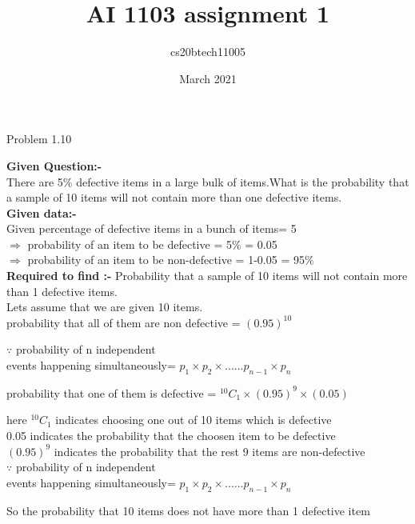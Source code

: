 \documentclass[12pt]{article}
\title{AI 1103 assignment 1}
\author{cs20btech11005 }
\date{March 2021}
\begin{document}
\maketitle

\begin{center}
    Problem 1.10
\end{center}
\textbf{Given Question:-}\\
There are 5\% defective items in a large bulk of items.What is the probability that a sample of 10 items will not contain more than one defective items.\\
\textbf{Given data:-}\\
Given percentage of defective items in a bunch of items= 5\\
$\Rightarrow$ probability of an item to be defective \hspace{0.8
cm}= 5$ \% $\hspace{15pt} = 0.05\\
$\Rightarrow$ probability of an item to be non-defective = 1-0.05 = 95$\%$\\
\textbf{Required to find :-} Probability that a sample of 10 items will not contain more than 1 defective items.\\
Lets assume that we are given 10 items.\\
probability that all of them are non defective = $(0.95)^{10}$
\begin{flushright}
$\because$ probability of n independent \hspace*{1.8in} \\ events happening simultaneously= $p_1 \times p_2 \times ...... p_{n-1} \times p_n$
\end{flushright}
probability that one of them is defective = $^{10}C_1 \times (0.95)^9 \times (0.05)$
\begin{flushright}
here $^{10}C_1$ indicates choosing one out 
of 10 items which is defective\\
0.05 indicates the probability that the 
choosen item to be defective\\
$(0.95)^9$ indicates the probability that 
the rest 9 items are non-defective\\
$\because$ probability of n independent \hspace*{1.8in} \\ events happening simultaneously= $p_1 \times p_2 \times ...... p_{n-1} \times p_n$
\end{flushright}
So the probability that 10 items does not have more than 1 defective item \\
\end{document}

